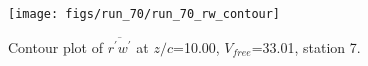 \begin{figure}[H]
\centering
\texttt{[image: figs/run\_70/run\_70\_rw\_contour]}
\caption{Contour plot of $\overline{r^\prime w^\prime}$ at $z/c$=10.00, $V_{free}$=33.01, station 7.}
\end{figure}


